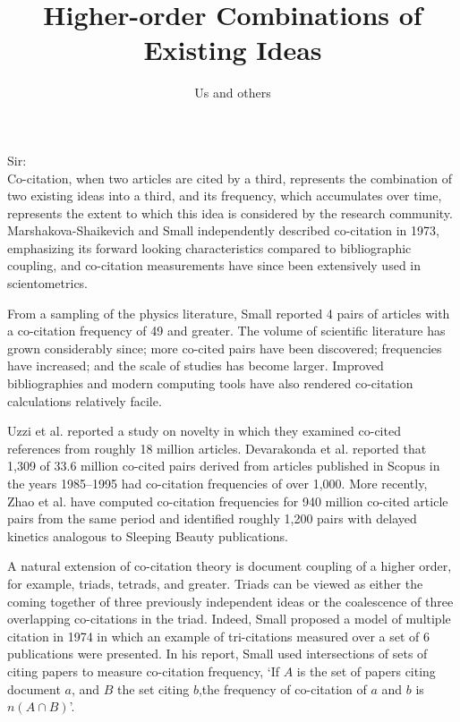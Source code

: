\documentclass[notitlepage]{report}
\title{Higher-order Combinations of Existing Ideas}
\author{Us and others}
\date{}
\begin{document}
\maketitle
\thispagestyle{empty}
Sir:\\

Co-citation, when two articles are cited by a third, represents the combination of two existing ideas into a third, and its frequency, which accumulates over time, represents the extent to which this idea is considered by the research community. Marshakova-Shaikevich and Small independently described co-citation in 1973, emphasizing its forward looking characteristics compared to bibliographic coupling, and co-citation measurements have since been extensively used in scientometrics.

From a sampling of the physics literature, Small reported 4 pairs of articles with a co-citation frequency of 49 and greater. The volume of scientific literature has grown considerably since; more co-cited pairs have been discovered; frequencies have increased; and the scale of studies has become larger. Improved bibliographies and modern computing tools have also rendered co-citation calculations relatively facile. 

Uzzi et al. reported a study on novelty in which they examined co-cited references from roughly 18 million articles. Devarakonda et al. reported that 1,309 of 33.6 million co-cited pairs derived from articles published in Scopus in the years 1985--1995 had co-citation frequencies of over 1,000. More recently, Zhao et al. have computed co-citation frequencies for 940 million co-cited article pairs from the same period and identified roughly 1,200 pairs with delayed kinetics analogous to Sleeping Beauty publications. 

A natural extension of co-citation theory is document coupling of a higher order, for example, triads, tetrads, and greater. Triads can be viewed as either the coming together of three previously independent ideas or the coalescence of three overlapping co-citations in the triad. Indeed, Small proposed a model of multiple citation in 1974 in which an example of tri-citations measured over a set of 6 publications were presented. In his report, Small used intersections of sets of citing papers to measure co-citation frequency, `If $A$ is the set of papers citing document $a$, and $B$ the set citing $b$,the frequency of co-citation of $a$ and $b$ is $n(A \cap B)$'.
\end{document}
